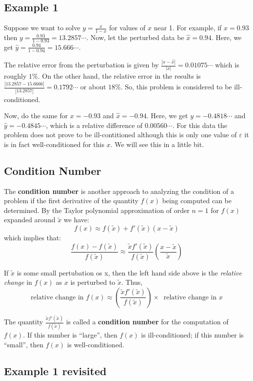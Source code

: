 \documentclass [titlepage,12pt,letter] {article}
\begin{document}
\subsection{Example 1}
Suppose we want to solve $y=\frac{x}{1-x}$ for values of $x$ near 1. For example, if $x=0.93$ then $y=\frac{0.93}{1-0.93}=13.2857\cdots$. Now, let the perturbed data be $\hat{x}=0.94$. Here, we get $\hat{y}=\frac{0.94}{1-0.94}=15.666\cdots$.

The relative error from the perturbation is given by $\frac{|x-\hat{x}|}{|x|}=0.01075\cdots$ which is roughly $1\%$. On the other hand, the relative error in the results is $\frac{|13.2857-15.6666|}{|13.2857|}=0.1792\cdots$ or about $18\%$. So, this problem is considered to be ill-conditioned.

Now, do the same for $x=-0.93$ and $\hat{x}=-0.94$. Here, we get $y=-0.4818\cdots$ and $\hat{y}=-0.4845\cdots$, which is a relative difference of $0.00560\cdots$. For this data the problem does not prove to be ill-contitioned although this is only one value of $\varepsilon$ it is in fact well-conditioned for this $x$. We will see this in a little bit.

\subsection{Condition Number}
The {\bf condition number} is another approach to analyzing the
condition of a problem if the first derivative of the quantity $f(x)$ being computed can be determined. By the Taylor polynomial approximation of order $n=1$ for $f(x)$ expanded around $\tilde x$ we have: 
\[
f(x) \approx f(\tilde x) + f'(\tilde x)(x - \tilde x)
\]
\noindent 
which implies that:  
\[ 
  \frac{f(x) - f(\tilde x)}{f(\tilde x)} \approx \frac{\tilde x f'( \tilde x)}{f(\tilde x)} \left( \frac{x-\tilde x}{\tilde x} \right) 
\] 

\noindent 
If $\tilde x$ is some small pertubation os x, then the left hand side above is the {\it relative change} in $f(x)$ as $x$ is perturbed to $\tilde x$. Thus, 
\[ 
\mbox{relative change in } f(x) \approx \left( \frac{\tilde xf'(\tilde x)}{f(\tilde x)} \right) \times \;\; \mbox{relative change in } x 
\]

The quantity $\frac{\tilde xf'(\tilde x)}{f(\tilde x)}$ is called a {\bf condition number} for the computation of $f(x)$. If this number is ``large'', then $f(x)$ is ill-conditioned; if this number is ``small'', then $f(x)$ is well-conditioned. 

\subsection{Example 1 revisited}
\end{document}
